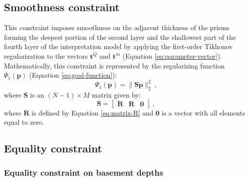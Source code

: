 \documentclass[manuscript]{geophysics}
\begin{document}
\subsection{Smoothness constraint}


This constraint imposes smoothness on the adjacent thickness of the prisms forming the
deepest portion of the second layer and the shallowest part of the fourth layer
of the interpretation model by applying the first-order Tikhonov regularization
\citep{aster-etal2005} to the vectors $\mathbf{t}^{Q}$ and $\mathbf{t}^{m}$ 
(Equation \ref{eq:parameter-vector}). 
Mathematically, this constraint is represented by the regularizing function
$\Psi_{1}(\mathbf{p})$ (Equation \ref{eq:goal-function}):
\begin{equation}
\Psi_{1}(\mathbf{p}) = \| \mathbf{S}\mathbf{p} \|_{2}^{2} \: ,
\label{eq:smootheness-contraint}
\end{equation}
where $\mathbf{S}$ is an $\left( N-1 \right) \times M$ matrix given by:
\begin{equation}
\mathbf{S} = \begin{bmatrix}
\mathbf{R} & \mathbf{R} & \mathbf{0}
\end{bmatrix} \: ,
\label{eq:matrix-S}
\end{equation}
where $\mathbf{R}$ is defined by Equation \ref{eq:matrix-R} and $\mathbf{0}$
is a vector with all elements equal to zero.


\subsection{Equality constraint}

\subsubsection*{Equality constraint on basement depths}
\end{document}
